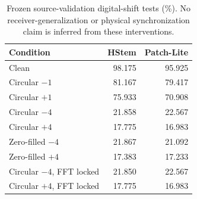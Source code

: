 \begin{table}[t]
\centering\caption{Frozen source-validation digital-shift tests (\%). No receiver-generalization or physical synchronization claim is inferred from these interventions.}
\label{tab:stress}
\setlength{\tabcolsep}{6pt}\footnotesize
\begin{tabular}{lrr}
\toprule Condition & HStem & Patch-Lite\\\midrule
Clean & 98.175 & 95.925\\
Circular $-1$ & 81.167 & 79.417\\
Circular $+1$ & 75.933 & 70.908\\
Circular $-4$ & 21.858 & 22.567\\
Circular $+4$ & 17.775 & 16.983\\
Zero-filled $-4$ & 21.867 & 21.092\\
Zero-filled $+4$ & 17.383 & 17.233\\
Circular $-4$, FFT locked & 21.850 & 22.567\\
Circular $+4$, FFT locked & 17.775 & 16.983\\
\bottomrule\end{tabular}
\end{table}
